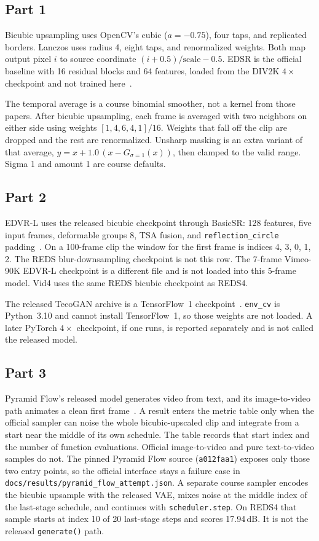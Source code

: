 \documentclass[10pt,twocolumn,letterpaper]{article}
\begin{document}
\subsection{Part 1}
Bicubic upsampling uses OpenCV's cubic ($a=-0.75$), four taps, and replicated borders.
Lanczos uses radius 4, eight taps, and renormalized weights.
Both map output pixel $i$ to source coordinate $(i+0.5)/\mathrm{scale}-0.5$.
EDSR is the official baseline with 16 residual blocks and 64 features, loaded from the DIV2K $4\times$ checkpoint and not trained here~\cite{lim2017edsr}.

The temporal average is a course binomial smoother, not a kernel from those papers.
After bicubic upsampling, each frame is averaged with two neighbors on either side using weights $[1,4,6,4,1]/16$.
Weights that fall off the clip are dropped and the rest are renormalized.
Unsharp masking is an extra variant of that average,
$y = x + 1.0\,(x - G_{\sigma=1}(x))$,
then clamped to the valid range.
Sigma 1 and amount 1 are course defaults.

\subsection{Part 2}
EDVR-L uses the released bicubic checkpoint through BasicSR: 128 features, five input frames, deformable groups 8, TSA fusion, and \texttt{reflection\_circle} padding~\cite{wang2019edvr}.
On a 100-frame clip the window for the first frame is indices 4, 3, 0, 1, 2.
The REDS blur-downsampling checkpoint is not this row.
The 7-frame Vimeo-90K EDVR-L checkpoint is a different file and is not loaded into this 5-frame model. Vid4 uses the same REDS bicubic checkpoint as REDS4.

The released TecoGAN archive is a TensorFlow~1 checkpoint~\cite{chu2020tecogan}.
\texttt{env\_cv} is Python~3.10 and cannot install TensorFlow~1, so those weights are not loaded.
A later PyTorch $4\times$ checkpoint, if one runs, is reported separately and is not called the released model.

\subsection{Part 3}
Pyramid Flow's released model generates video from text, and its image-to-video path animates a clean first frame~\cite{jin2025pyramid}.
A result enters the metric table only when the official sampler can noise the whole bicubic-upscaled clip and integrate from a start near the middle of its own schedule.
The table records that start index and the number of function evaluations.
Official image-to-video and pure text-to-video samples do not.
The pinned Pyramid Flow source (\texttt{a012faa1}) exposes only those two entry points, so the official interface stays a failure case in \texttt{docs/results/pyramid\_flow\_attempt.json}.
A separate course sampler encodes the bicubic upsample with the released VAE, mixes noise at the middle index of the last-stage schedule, and continues with \texttt{scheduler.step}.
On REDS4 that sample starts at index 10 of 20 last-stage steps and scores 17.94\,dB.
It is not the released \texttt{generate()} path.
\end{document}
